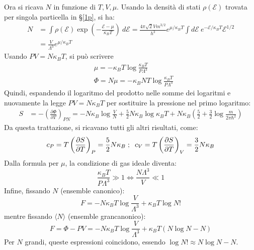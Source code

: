 \documentclass[10pt, a4paper]{scrartcl}
\numberwithin{equation}{subsection}
\theoremstyle{style1}
\theoremstyle{style2}
\begin{document}
Ora si ricava $N$ in funzione di $T,V,\mu $. Usando la densit\`a di stati $\rho (\mathscr{E})$ trovata per singola particella in \S \ref{1p}, si ha:
\begin{equation}
	\begin{split}
		N &= \int \rho (\mathscr{E}) \exp\left(- \frac{\mathscr{E}-\mu }{\kappa _BT}\right) \ d \mathscr{E}= \frac{4\pi \sqrt{2} V m^{ 3 /2 } }{h^3}e^{ \mu  / \kappa _B T} \int d\mathscr{E} \ e^{ - \mathscr{E} / \kappa _B T}  \mathscr{E}^{1 / 2} \\
		  &= \frac{V}{\Lambda ^3}e^{\mu  / \kappa _B T} 
	\end{split}
\end{equation}
Usando $PV = N\kappa _B T$, si pu\`o scrivere
\begin{equation}
	\begin{split}
		&\mu = - \kappa _B T \log \frac{\kappa _B T}{P \Lambda ^3}\\
		&\Phi = N\mu  = - \kappa _B NT \log \frac{\kappa _B T}{P\Lambda ^3}
	\end{split}
\end{equation}
Quindi, espandendo il logaritmo del prodotto nelle somme dei logaritmi e nuovamente la legge $PV = N\kappa _B T$ per sostituire la pressione nel primo logaritmo:
\begin{equation}
	\begin{split}
		S &= - \left(\frac{\partial \Phi}{\partial T} \right) _{PN} = - N\kappa _B \log \frac{V}{N} + \frac{5}{2} N\kappa _B \log\kappa _B T + N\kappa _B \left(\frac{5}{2} + \frac{3}{2} \log \frac{m}{2\pi\hbar ^2}\right) 
	\end{split}
\end{equation}
Da questa trattazione, si ricavano tutti gli altri risultati, come:
\[
c_P = T \left(\frac{\partial S}{\partial T} \right) _P =  \frac{5}{2}N\kappa _B \hspace{.1cm} ; \hspace{.2cm} c_V = T \left(\frac{\partial S}{\partial T} \right) _V = \frac{3}{2} N \kappa _B 
\] 
Dalla formula per $\mu $, la condizione di gas ideale diventa:
\begin{equation}
	\frac{\kappa _B  T}{P\Lambda ^3}  \gg 1 \iff \frac{N\Lambda ^3}{V}\ll 1
\end{equation}
Infine, fissando $N$ (ensemble canonico):
\begin{equation}
	F = -N\kappa _BT \log \frac{V}{\Lambda ^3}  + \kappa _BT \log N!
\end{equation}
mentre fissando $\langle N \rangle$ (ensemble grancanonico):
\begin{equation}
	F = \Phi - PV = - N\kappa _B T  \log \frac{V}{\Lambda ^3} + \kappa _B T (N \log N - N)
\end{equation}
Per $N$ grandi, queste espressioni coincidono, essendo $\log N! \approx N \log N - N$.
\end{document}
